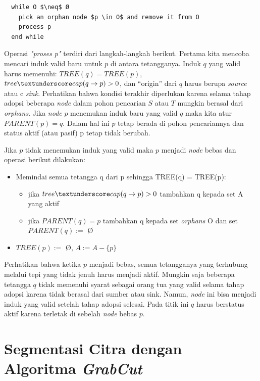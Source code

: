 \begin{lstlisting}
  while O $\neq$ Ø  
    pick an orphan node $p \in O$ and remove it from O
    process p
  end while
\end{lstlisting}

Operasi \emph{"proses p"} terdiri dari langkah-langkah berikut. Pertama kita mencoba mencari 
induk valid baru untuk \(p\) di antara tetangganya. Induk \(q\) yang valid harus memenuhi: 
\(TREE(q) = TREE(p)\), \(tree\textunderscore cap(q \rightarrow p) > 0\), dan “origin” 
dari \(q\) harus berupa \emph{source} atau c \emph{sink}. Perhatikan bahwa kondisi terakhir 
diperlukan karena selama tahap adopsi beberapa \emph{node} dalam pohon pencarian \(S\) atau \(T\) 
mungkin berasal dari \emph{orphans}. Jika \emph{node} \(p\) menemukan induk baru yang valid 
\(q\) maka kita atur \(PARENT(p) = q\). Dalam hal ini \(p\) tetap berada di pohon pencariannya 
dan status aktif (atau pasif) p tetap tidak berubah. 

Jika \(p\) tidak menemukan induk yang valid maka \(p\) menjadi \emph{node} bebas dan operasi 
berikut dilakukan:

\begin{itemize}
  \item Memindai semua tetangga q dari p sehingga TREE(q) = TREE(p):  
  \begin{itemize}
    \item jika \(tree\textunderscore cap(q \rightarrow p) > 0\) tambahkan q kepada set A yang aktif
    \item jika \(PARENT(q) = p\) tambahkan q kepada set \emph{orphans} O dan set \(PARENT(q) :=\) Ø
  \end{itemize}
  \item \(TREE(p) :=\) Ø, \(A := A - \{p\}\)
\end{itemize}

Perhatikan bahwa ketika \(p\) menjadi bebas, semua tetangganya yang terhubung melalui 
tepi yang tidak jenuh harus menjadi aktif. Mungkin saja beberapa tetangga \(q\) tidak 
memenuhi syarat sebagai orang tua yang valid selama tahap adopsi karena tidak berasal 
dari sumber atau sink. Namun, \emph{node} ini bisa menjadi induk yang valid setelah 
tahap adopsi selesai. Pada titik ini \(q\) harus berstatus aktif karena terletak di 
sebelah \emph{node} bebas \(p\).


\section{Segmentasi Citra dengan Algoritma \emph{GrabCut}}

